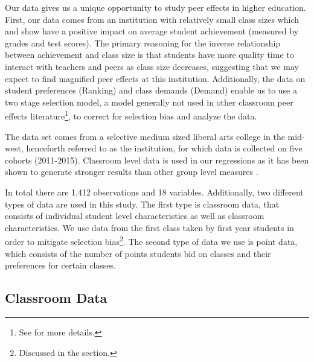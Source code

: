 Our data gives us a unique opportunity to study peer effects in higher education.
First, our data comes from an institution with relatively small class sizes which \citet{diette2015class} and \citet{kokkelenberg2008effects} show have a positive impact on average student achievement (measured by grades and test scores).
The primary reasoning for the inverse relationship between achievement and class size is that students have more quality time to interact with teachers and peers as class size decreases, suggesting that we may expect to find magnified peer effects at this institution. 
Additionally, the data on student preferences (Ranking) and class demands (Demand) enable us to use a two stage selection model, a model generally not used in other classroom peer effects literature\footnote{See  for more details.}, to correct for selection bias and analyze the data. 

The data set comes from a selective medium sized liberal arts college in the mid-west, henceforth referred to as the institution, for which data is collected on five cohorts (2011-2015). 
Classroom level data is used in our regressions as it has been shown to generate stronger results than other group level measures \citep{burke2013classroom}. 

In total there are 1,412 observations and 18 variables. 
Additionally, two different types of data are used in this study. 
The first type is classroom data, that consists of individual student level characteristics as well as classroom characteristics. 
We use data from the first class taken by first year students in order to mitigate selection bias\footnote{Discussed in the  section.}. 
The second type of data we use is point data, which consists of the number of points students bid on classes and their preferences for certain classes. 

\subsection{Classroom Data}\label{data:classdata}


